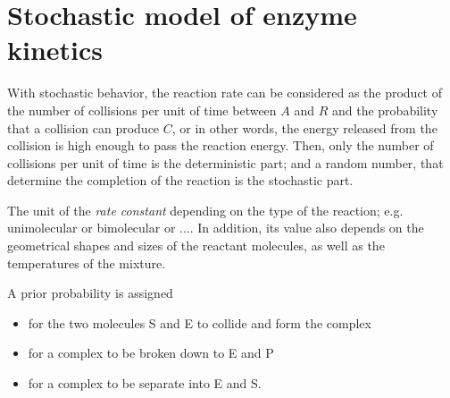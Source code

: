 \section{Stochastic model of enzyme kinetics}
\label{sec:stoch-model-enzyme}


\begin{framed}
  With stochastic behavior, the reaction rate can be considered as
  the product of the number of collisions per unit of time between $A$
  and $R$ and the probability that a collision can produce $C$, or in
  other words, the energy released from the collision is high enough
  to pass the reaction energy. Then, only the number of collisions per
  unit of time is the deterministic part; and a random number, that
  determine the completion of the reaction is the stochastic part. 

  The unit of the {\it rate constant} depending on the type of the
  reaction; e.g. unimolecular or bimolecular or .... In addition, its
  value also depends on the geometrical shapes and sizes of the
  reactant molecules, as well as the temperatures of the mixture.
\end{framed}

A prior probability is assigned 
\begin{itemize}
\item for the two molecules S and E to collide and form the complex
\item for a complex to be broken down to E and P
\item for a complex to be separate into E and S.
\end{itemize}

